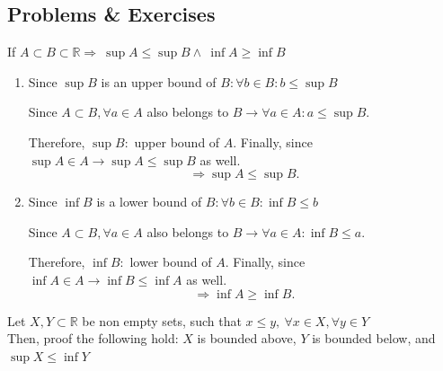 \newpage
\subsection{Problems \& Exercises}

\begin{problem}
If $A \subset B \subset \mathbb{R} \Rightarrow \  \sup{A} \leq \sup{B} \wedge \ \inf{A} \geq \inf{B}$
\end{problem}

\begin{solution}
\begin{enumerate}[label=\roman*)]
\item Since $\sup{B}$ is an upper bound of $B: \forall b \in B: b \leq \sup{B}$

Since $A \subset B, \forall a \in A$ also belongs to $B \rightarrow \forall a \in A: a \leq \sup{B}$.

Therefore, $\sup{B}:$ upper bound of $A$. Finally, since $\sup{A} \in A \rightarrow \sup{A} \leq \sup{B}$ as well.
$$
\Rightarrow \sup{A} \leq \sup{B}.
$$

\item Since $\inf{B}$ is a lower bound of $B: \forall b \in B: \inf{B} \leq b$

Since $A \subset B, \forall a \in A$ also belongs to $B \rightarrow \forall a \in A: \inf{B} \leq a$.

Therefore, $\inf{B}:$ lower bound of $A$. Finally, since $\inf{A} \in A \rightarrow \inf{B} \leq \inf{A}$ as well.
$$
\Rightarrow \inf{A} \geq \inf{B}.
$$
\end{enumerate}
\end{solution}

\begin{problem}
Let $X, Y \subset \mathbb{R}$ be non empty sets, such that $x \leq y, \ \forall x \in X, \forall y \in Y $\\
Then, proof the following hold: $X$ is bounded above, $Y$ is bounded below, and $\sup{X} \leq \inf{Y}$
\end{problem}

